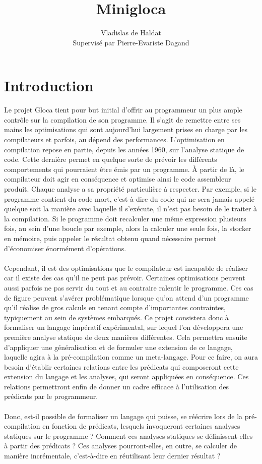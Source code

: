 \documentclass[a4paper, 10pt]{article}
\title{Minigloca}
\author{Vladislas de Haldat\\Supervisé par Pierre-Evariste Dagand}
\begin{document}


\maketitle
\newpage
\tableofcontents
\newpage

\section{Introduction}
Le projet Gloca tient pour but initial d'offrir au programmeur un plus ample contrôle sur la compilation de son programme.
Il s'agit de remettre entre ses mains les optimisations qui sont aujourd'hui largement prises en charge par les compilateurs
et parfois, au dépend des performances. L'optimisation en compilation repose en partie, depuis les années 1960, sur l'analyse statique de code. Cette
dernière permet en quelque sorte de prévoir les différents comportements qui pourraient être émis par un programme. À partir de là, le
compilateur doit agir en conséquence et optimise ainsi le code assembleur produit. Chaque analyse a sa propriété particulière à respecter.
Par exemple, si le programme contient du code mort, c'est-à-dire du code qui ne sera jamais appelé quelque soit la manière avec laquelle
il s'exécute, il n'est pas besoin de le traiter à la compilation. Si le programme doit recalculer une même expression plusieurs fois, au sein 
d'une boucle par exemple, alors la calculer une seule fois, la stocker en mémoire, puis appeler le résultat obtenu quand nécessaire permet 
d'économiser énormément d'opérations.
\\
\\
Cependant, il est des optimisations que le compilateur est incapable de réaliser car il existe des cas qu'il ne peut pas prévoir. Certaines
optimisations peuvent aussi parfois ne pas servir du tout et au contraire ralentir le programme. Ces cas de figure peuvent
s'avérer problématique lorsque qu'on attend d'un programme qu'il réalise de gros calculs en tenant compte d'importantes contraintes, typiquement au sein
de systèmes embarqués. Ce projet consistera donc à formaliser un langage impératif expérimental, sur lequel l'on développera une première analyse statique de deux manières
différentes. Cela permettra ensuite d'appliquer une généralisation et de formuler une extension de ce langage, laquelle agira à la pré-compilation comme un meta-langage.
Pour ce faire, on aura besoin d'établir certaines relations entre les prédicats qui composeront cette extension du langage et les
analyses, qui seront appliquées en conséquence. Ces relations permettront enfin de donner un cadre efficace à l'utilisation des prédicats par le programmeur.
\\
\\
Donc, est-il possible de formaliser un langage qui puisse, se réécrire lors de la pré-compilation en fonction de prédicats, lesquels invoqueront certaines
analyses statiques sur le programme ? Comment ces analyses statiques se définissent-elles à partir des prédicats ? Ces analyses pourront-elles, en outre,
se calculer de manière incrémentale, c'est-à-dire en réutilisant leur dernier résultat ?
\end{document}
